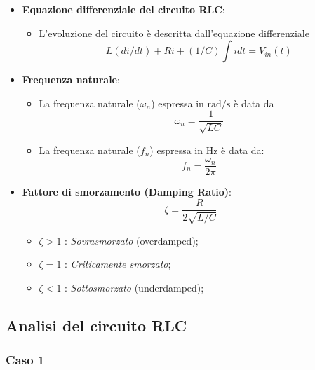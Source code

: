 \documentclass[a4paper,10pt]{article}
\begin{document}
\begin{itemize}
    \item \textbf{Equazione differenziale del circuito RLC}:
        \begin{itemize}
            \item L'evoluzione del circuito è descritta dall'equazione differenziale
                \begin{equation}
                    L(di/dt)+Ri+(1/C) \int i dt =V_{in}(t)
                \end{equation}
        \end{itemize}
    \item \textbf{Frequenza naturale}:
        \begin{itemize}
            \item La frequenza naturale (\(\omega_n\)) espressa in \(\si{\radian / \second}\) è data da 
                \begin{equation}
                    \omega_n = \frac{1}{\sqrt{LC}}
                \end{equation}
            \item La frequenza naturale (\(f_n\)) espressa in \(\si{\hertz}\) è data da:
                \begin{equation}
                    f_n = \frac{\omega_n}{2 \pi}
                \end{equation}
        \end{itemize}
    \item \textbf{Fattore di smorzamento (Damping Ratio)}:
        \begin{equation}
            \zeta = \frac{R}{2 \sqrt{L/C}}
        \end{equation}
        \begin{itemize}
            \item \(\zeta > 1\) : \textit{Sovrasmorzato} (overdamped);
            \item \(\zeta = 1\) : \textit{Criticamente smorzato};
            \item \(\zeta < 1\) : \textit{Sottosmorzato} (underdamped);
        \end{itemize}
\end{itemize}

\subsection{Analisi del circuito RLC}

\subsubsection{Caso 1}
\end{document}

